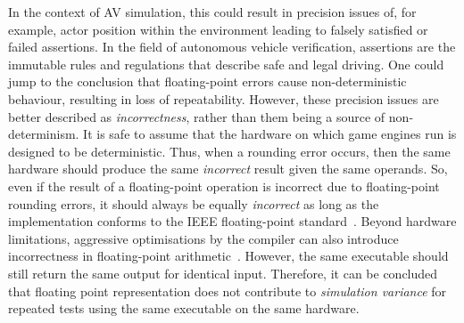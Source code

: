 \documentclass[letterpaper, 10 pt, journal, twoside]{IEEEtran}
\begin{document}
In the context of AV simulation, this could result in precision issues of, for example, actor position within the environment leading to falsely satisfied or failed assertions.
In the field of autonomous vehicle verification, assertions are the immutable rules and regulations that describe safe and legal driving. 
%
One could jump to the conclusion that floating-point errors cause non-deterministic behaviour, resulting in loss of repeatability. However, these precision issues are better described as \textit{incorrectness}, rather than them being a source of non-determinism. 
%
It is safe to assume that the hardware on which game engines run is designed to be deterministic. 
%
Thus, when a rounding error occurs, then the same hardware should produce the same \textit{incorrect} result given the same operands. 
%
So, even if the result of a floating-point operation is incorrect due to floating-point rounding errors, it should always 
be equally \textit{incorrect} as long as the implementation conforms to the IEEE floating-point standard~\cite{8766229}.
%
Beyond hardware limitations, aggressive optimisations by the compiler can also introduce incorrectness in floating-point arithmetic~\cite{llvm-floating-point}. However, the same executable should still return the same output for identical input. 
%
Therefore, it can be concluded that floating point representation does not contribute to \textit{simulation variance} for repeated tests using the same executable on the same hardware.
%
%
\end{document}
